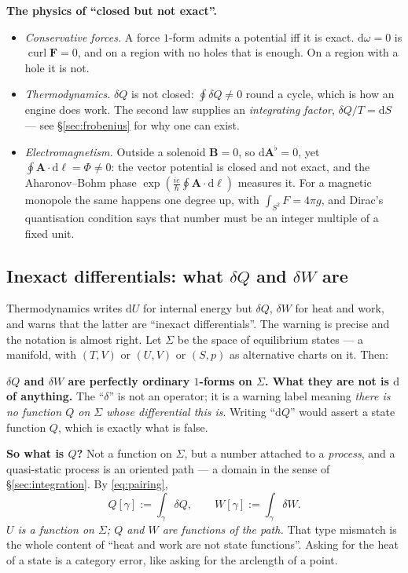 \documentclass[10pt,a4paper]{article}
\newcommand{\dd}{\mathrm{d}}
\newcommand{\A}{\mathbf{A}}
\newcommand{\B}{\mathbf{B}}
\DeclareMathOperator{\curl}{curl}
\theoremstyle{plain}
\theoremstyle{definition}
\numberwithin{equation}{section}
\begin{document}
\begin{keybox}
\textbf{The physics of ``closed but not exact''.}
\begin{itemize}[leftmargin=1.2em,itemsep=2pt]
\item \emph{Conservative forces.} A force $1$-form admits a potential iff it is exact.
      $\dd\omega=0$ is $\curl\mathbf F=0$, and on a region with no holes that is enough. On a
      region with a hole it is not.
\item \emph{Thermodynamics.} $\delta Q$ is not closed: $\oint\delta Q\ne0$ round a cycle,
      which is how an engine does work. The second law supplies an \emph{integrating factor},
      $\delta Q/T=\dd S$ --- see \S\ref{sec:frobenius} for why one can exist.
\item \emph{Electromagnetism.} Outside a solenoid $\B=0$, so $\dd\A^\flat=0$, yet
      $\oint\A\cdot\dd\boldsymbol\ell=\Phi\ne0$: the vector potential is closed and not exact,
      and the Aharonov--Bohm phase $\exp(\tfrac{ie}\hbar\oint\A\cdot\dd\boldsymbol\ell)$ measures
      it. For a magnetic monopole the same happens one degree up, with
      $\int_{S^2}F=4\pi g$, and Dirac's quantisation condition says that number must be an
      integer multiple of a fixed unit.
\end{itemize}
\end{keybox}

\subsection{Inexact differentials: what $\delta Q$ and $\delta W$ are}
\label{sec:inexact}

Thermodynamics writes $\dd U$ for internal energy but $\delta Q$, $\delta W$ for heat and work,
and warns that the latter are ``inexact differentials''. The warning is precise and the notation
is almost right. Let $\Sigma$ be the space of equilibrium states --- a manifold, with $(T,V)$ or
$(U,V)$ or $(S,p)$ as alternative charts on it. Then:

\begin{keybox}
\textbf{$\delta Q$ and $\delta W$ are perfectly ordinary $1$-forms on $\Sigma$. What they are
not is $\dd$ of anything.} The ``$\delta$'' is not an operator; it is a warning label meaning
\emph{there is no function $Q$ on $\Sigma$ whose differential this is}. Writing ``$\dd Q$''
would assert a state function $Q$, which is exactly what is false.
\end{keybox}

\noindent \textbf{So what is $Q$?} Not a function on $\Sigma$, but a number attached to a
\emph{process}, and a quasi-static process is an oriented path --- a domain in the sense of
\S\ref{sec:integration}. By \eqref{eq:pairing},
\begin{equation}
Q[\gamma]:=\int_\gamma\delta Q,\qquad W[\gamma]:=\int_\gamma\delta W .
\label{eq:QW}
\end{equation}
\emph{$U$ is a function on $\Sigma$; $Q$ and $W$ are functions of the path.} That type mismatch
is the whole content of ``heat and work are not state functions''. Asking for the heat of a
state is a category error, like asking for the arclength of a point.
\end{document}
